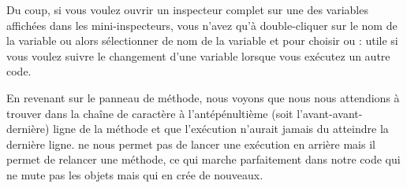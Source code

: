 \documentclass[a4paper,10pt,twoside]{book}
\begin{document}

Du coup, si vous voulez ouvrir un inspecteur complet sur une des variables
affichées dans les mini-inspecteurs, vous n'avez qu'à double-cliquer
sur le nom de la variable ou alors sélectionner de nom de la variable et 
\actclickz pour choisir
  ou :
utile si vous voulez suivre 
le changement d'une variable lorsque vous exécutez un autre code.

En revenant sur le panneau de méthode, nous voyons que nous
nous attendions à trouver  dans la chaîne de caractère
 à l'antépénultième (soit l'avant-avant-dernière) 
ligne de la méthode et que l'exécution n'aurait jamais du atteindre
la dernière ligne.
\pharo ne nous permet pas de lancer une exécution en arrière mais
il permet de relancer une méthode, ce qui marche parfaitement dans
notre code qui ne mute pas les objets mais qui en crée de nouveaux.

\end{document}
